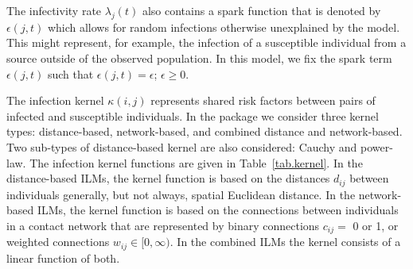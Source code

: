 \documentclass[nojss,shortnames]{jss}
\begin{document}
The infectivity rate $\lambda_{j}(t)$ also contains a spark function that is denoted by $\epsilon(j,t)$ which allows for random infections otherwise unexplained by the model. This might represent, for example, the infection of a susceptible individual from a source outside of the observed population. In this model, we fix the spark term $\epsilon(j,t)$ such that $\epsilon(j,t) = \epsilon$; $\epsilon \geq 0$.

The infection kernel $\kappa(i,j)$ represents shared risk factors between pairs of infected and susceptible individuals. 
In the  package we consider three kernel types: distance-based, network-based, and combined distance and network-based. Two sub-types of distance-based kernel are also considered: Cauchy and power-law.
The infection kernel functions are given in Table~\ref{tab.kernel}. In the distance-based ILMs, the kernel function is based on the distances $d_{ij}$ between individuals generally, but not always, spatial Euclidean distance. In the network-based ILMs, the kernel function is based on the connections between individuals in a contact network that are represented by binary connections $c_{ij} =$ 0 or 1, or weighted connections $w_{ij}\in [0,\infty)$. In the combined ILMs the kernel consists of a linear function of both.
\end{document}
